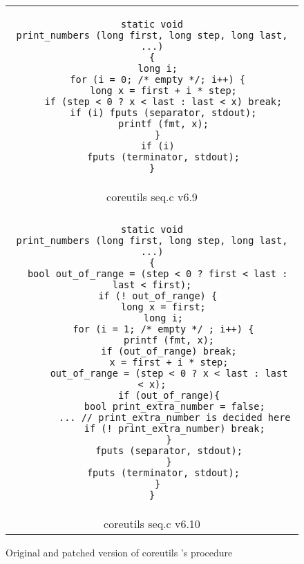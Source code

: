 \begin{figure}[H]
\centering
\begin{tabular}{c}
\begin{lstlisting}
static void
print_numbers (long first, long step, long last, ...)
{
  long i;
  for (i = 0; /* empty */; i++) {
    long x = first + i * step;
    if (step < 0 ? x < last : last < x) break;
    if (i) fputs (separator, stdout);
    printf (fmt, x);
  }
  if (i)
    fputs (terminator, stdout);
}
\end{lstlisting}\\
coreutils seq.c v6.9 \\
\hline
\\
\begin{lstlisting}
static void
print_numbers (long first, long step, long last, ...)
{
  bool out_of_range = (step < 0 ? first < last : last < first);
  if (! out_of_range) {
    long x = first;
    long i;
    for (i = 1; /* empty */ ; i++) {
      printf (fmt, x);
      if (out_of_range) break;
      x = first + i * step;
      out_of_range = (step < 0 ? x < last : last < x);
      if (out_of_range){
        bool print_extra_number = false;
        ... // print_extra_number is decided here
        if (! print_extra_number) break;
      }
      fputs (separator, stdout);
      }
    fputs (terminator, stdout);
  }
}
\end{lstlisting}
\\
coreutils seq.c v6.10
\end{tabular}
\caption{Original and patched version of coreutils 's  procedure}
\end{figure} 